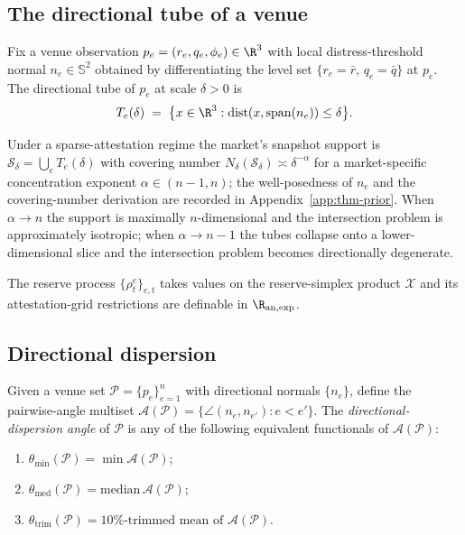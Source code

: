\subsection{The directional tube of a venue}\label{sec:tube}

\begin{definition}\label{def:tube}
Fix a venue observation $p_e = (r_e, q_e, \phi_e) \in \R^3$ with
local distress-threshold normal $n_e \in \mathbb{S}^2$ obtained by
differentiating the level set
$\{r_e = \bar r,\, q_e = \bar q\}$ at $p_e$. The directional tube
of $p_e$ at scale $\delta > 0$ is
\begin{equation}\label{eq:tube}
T_e(\delta) \;=\; \bigl\{ x \in \R^3 :
\mathrm{dist}(x, \mathrm{span}(n_e)) \le \delta \bigr\}.
\end{equation}
\end{definition}

Under a sparse-attestation regime the market's snapshot support is
$\mathcal{S}_\delta = \bigcup_e T_e(\delta)$ with covering number
$N_\delta(\mathcal{S}_\delta) \asymp \delta^{-\alpha}$ for a
market-specific concentration exponent $\alpha \in (n{-}1, n)$; the
well-posedness of $n_e$ and the covering-number derivation are
recorded in Appendix~\ref{app:thm-prior}. When $\alpha \to n$ the
support is maximally $n$-dimensional and the intersection problem
is approximately isotropic; when $\alpha \to n{-}1$ the tubes
collapse onto a lower-dimensional slice and the intersection
problem becomes directionally degenerate.

\begin{assumption}\label{ass:regularity}
The reserve process $\{\rho_t^e\}_{e,t}$ takes values on the
reserve-simplex product $\mathcal{X}$ and its
attestation-grid restrictions are definable in
$\R_{\mathrm{an},\exp}$.
\end{assumption}

\subsection{Directional dispersion}\label{sec:dispersion}

\begin{definition}\label{def:disp-angle}
Given a venue set $\mathcal{P} = \{p_e\}_{e=1}^{n}$ with directional
normals $\{n_e\}$, define the pairwise-angle multiset
$\mathcal{A}(\mathcal{P}) = \{\angle(n_e, n_{e'}) : e < e'\}$. The
\emph{directional-dispersion angle} of $\mathcal{P}$ is any of the
following equivalent functionals of $\mathcal{A}(\mathcal{P})$:
\begin{enumerate}
  \item[(i)] $\theta_{\min}(\mathcal{P}) =
             \min \mathcal{A}(\mathcal{P})$;
  \item[(ii)] $\theta_{\mathrm{med}}(\mathcal{P}) =
             \mathrm{median}\, \mathcal{A}(\mathcal{P})$;
  \item[(iii)] $\theta_{\mathrm{trim}}(\mathcal{P}) =
             10\%\text{-trimmed mean of } \mathcal{A}(\mathcal{P})$.
\end{enumerate}
\end{definition}

